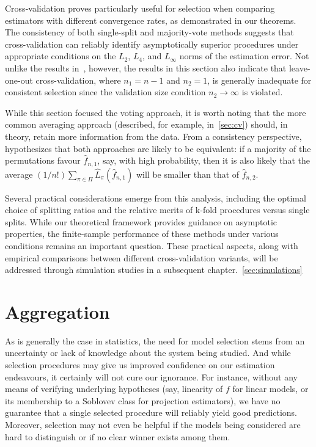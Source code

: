 \documentclass[11pt, letter paper]{article}
\newcommand{\1}{\mathmybb{1}}
\newcommand{\0}{\emptyset}
\newcommand{\fhat}[2]{\hat{f}_{#1, #2}}
\begin{document}
Cross-validation proves particularly useful for selection when comparing estimators with different convergence rates, as demonstrated in our theorems. The consistency of both single-split and majority-vote methods suggests that cross-validation can reliably identify asymptotically superior procedures under appropriate conditions on the \(L_{2}\), \(L_4\), and \(L_{\infty}\) norms of the estimation error. Not unlike the results in~\textcite{shao_1993}, however, the results in this section also indicate that leave-one-out cross-validation, where $n_1 = n-1$ and $n_2 = 1$, is generally inadequate for consistent selection since the validation size condition $n_2 \to \infty$ is violated.

While this section focused the voting approach, it is worth noting that the more common averaging approach (described, for example, in~\ref{sec:cv}) should, in theory, retain more information from the data. From a consistency perspective, \textcite{yang_2007} hypothesizes that both approaches are likely to be equivalent: if a majority of the permutations favour \(\fhat{n}{1}\), say, with high probability, then it is also likely that the average \((1/n!)\sum_{\pi\in\Pi}\hat{L}_{\pi}(\fhat{n}{1})\) will be smaller than that of \(\fhat{n}{2}\).

Several practical considerations emerge from this analysis, including the optimal choice of splitting ratios and the relative merits of k-fold procedures versus single splits. While our theoretical framework provides guidance on asymptotic properties, the finite-sample performance of these methods under various conditions remains an important question. These practical aspects, along with empirical comparisons between different cross-validation variants, will be addressed through simulation studies in a subsequent chapter.~\ref{sec:simulations}


\section{Aggregation}

As is generally the case in statistics, the need for model selection stems from an uncertainty or lack of knowledge about the system being studied. And while selection procedures may give us improved confidence on our estimation endeavours, it certainly will not cure our ignorance. For instance, without any means of verifying underlying hypotheses (say, linearity of \(f\) for linear models, or its membership to a Soblovev class for projection estimators), we have no guarantee that a single selected procedure will reliably yield good predictions. Moreover, selection may not even be helpful if the models being considered are hard to distinguish or if no clear winner exists among them. 
\end{document}

